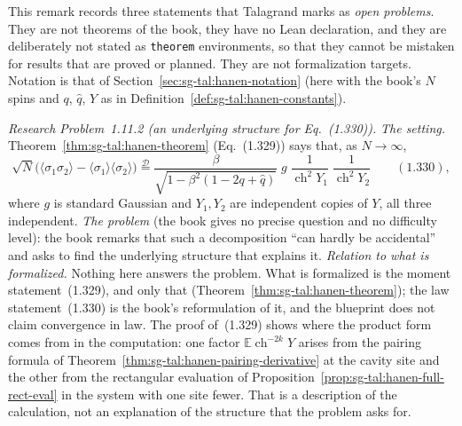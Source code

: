 \begin{remark}
\label{rem:sg-tal:research-1111}
This remark records three statements that Talagrand marks as \emph{open problems}. They are not theorems of the book, they have no Lean declaration, and they are deliberately not stated as \texttt{theorem} environments, so that they cannot be mistaken for results that are proved or planned. They are not formalization targets. Notation is that of Section~\ref{sec:sg-tal:hanen-notation} (here with the book's $N$ spins and $q$, $\hat q$, $Y$ as in Definition~\ref{def:sg-tal:hanen-constants}).

\emph{Research Problem~1.11.2 (an underlying structure for Eq.~(1.330)).}
\emph{The setting.} Theorem~\ref{thm:sg-tal:hanen-theorem} (Eq.~(1.329)) says that, as $N\to\infty$,
\[
\sqrt N\bigl(\langle\sigma_1\sigma_2\rangle-\langle\sigma_1\rangle\langle\sigma_2\rangle\bigr)
\stackrel{\mathcal D}{=}\frac{\beta}{\sqrt{1-\beta^2(1-2q+\hat q)}}\;g\;\frac1{\operatorname{ch}^2Y_1}\;\frac1{\operatorname{ch}^2Y_2}\qquad(1.330),
\]
where $g$ is standard Gaussian and $Y_1,Y_2$ are independent copies of $Y$, all three independent. \emph{The problem} (the book gives no precise question and no difficulty level): the book remarks that such a decomposition ``can hardly be accidental'' and asks to find the underlying structure that explains it.
\emph{Relation to what is formalized.} Nothing here answers the problem. What is formalized is the moment statement~(1.329), and only that (Theorem~\ref{thm:sg-tal:hanen-theorem}); the law statement~(1.330) is the book's reformulation of it, and the blueprint does not claim convergence in law. The proof of~(1.329) shows where the product form comes from in the computation: one factor $\mathbb E\operatorname{ch}^{-2k}Y$ arises from the pairing formula of Theorem~\ref{thm:sg-tal:hanen-pairing-derivative} at the cavity site and the other from the rectangular evaluation of Proposition~\ref{prop:sg-tal:hanen-full-rect-eval} in the system with one site fewer. That is a description of the calculation, not an explanation of the structure that the problem asks for.


\end{remark}
